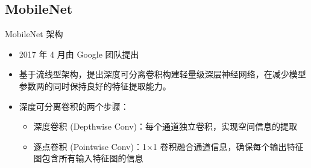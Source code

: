 \documentclass{beamer}
\begin{document}
\subsection{MobileNet}
\begin{frame}{MobileNet 架构}

    \begin{itemize}
        \item 2017 年 4 月由 Google 团队提出
        \item 基于流线型架构，提出深度可分离卷积构建轻量级深层神经网络，在减少模型参数两的同时保持良好的特征提取能力。
        \item 深度可分离卷积的两个步骤：
        \begin{itemize}
            \item 深度卷积 (Depthwise Conv)：每个通道独立卷积，实现空间信息的提取
            \item 逐点卷积 (Pointwise Conv)：1$\times$1 卷积融合通道信息，确保每个输出特征图包含所有输入特征图的信息
        \end{itemize}
    \end{itemize}


\end{frame}
\end{document}
